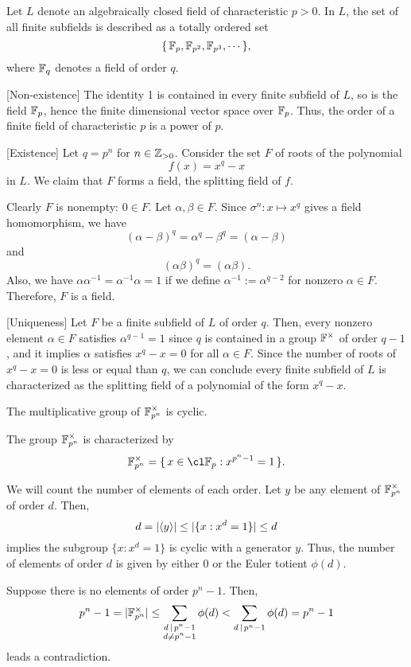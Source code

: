 \documentclass{../note}
\begin{document}
\begin{thm}
Let $L$ denote an algebraically closed field of characteristic $p>0$.
In $L$, the set of all finite subfields is described as a totally ordered set
\[\{\,\mathbb{F}_p,\mathbb{F}_{p^2},\mathbb{F}_{p^3},\cdots\,\},\]
where $\mathbb{F}_q$ denotes a field of order $q$.
\end{thm}
\begin{pf}
[Non-existence]
The identity 1 is contained in every finite subfield of $L$, so is the field $\mathbb{F}_p$, hence the finite dimensional vector space over $\mathbb{F}_p$.
Thus, the order of a finite field of characteristic $p$ is a power of $p$.

[Existence]
Let $q=p^n$ for $n\in\mathbb{Z}_{>0}$.
Consider the set $F$ of roots of the polynomial
\[f(x)=x^q-x\]
in $L$.
We claim that $F$ forms a field, the splitting field of $f$.

Clearly $F$ is nonempty: $0\in F$.
Let $\alpha,\beta\in F$.
Since $\sigma^n:x\mapsto x^q$ gives a field homomorphism, we have
\[(\alpha-\beta)^q=\alpha^q-\beta^q=(\alpha-\beta)\]
and
\[(\alpha\beta)^q=(\alpha\beta).\]
Also, we have $\alpha\alpha^{-1}=\alpha^{-1}\alpha=1$ if we define $\alpha^{-1}:=\alpha^{q-2}$ for nonzero $\alpha\in F$.
Therefore, $F$ is a field.

[Uniqueness]
Let $F$ be a finite subfield of $L$ of order $q$.
Then, every nonzero element $\alpha\in F$ satisfies $\alpha^{q-1}=1$ since $q$ is contained in a group $\mathbb{F}^\times$ of order $q-1$, and it implies $\alpha$ satisfies $x^q-x=0$ for all $\alpha\in F$.
Since the number of roots of $x^q-x=0$ is less or equal than $q$, we can conclude every finite subfield of $L$ is characterized as the splitting field of a polynomial of the form $x^q-x$.
\end{pf}

\begin{thm}
The multiplicative group of $\mathbb{F}_{p^n}^\times$ is cyclic.
\end{thm}
\begin{pf}
The group $\mathbb{F}_{p^n}^\times$ is characterized by
\[\F_{p^n}^\times=\{\,x\in\cl\F_p:x^{p^n-1}=1\,\}.\]

We will count the number of elements of each order.
Let $y$ be any element of $\mathbb{F}_{p^n}^\times$ of order $d$.
Then,
\[d=|\langle y\rangle|\le|\{x:x^d=1\}|\le d\]
implies the subgroup $\{x:x^d=1\}$ is cyclic with a generator $y$.
Thus, the number of elements of order $d$ is given by either 0 or the Euler totient $\phi(d)$.

Suppose there is no elements of order $p^n-1$.
Then,
\[p^n-1=|\mathbb{F}_{p^n}^\times|\le\sum_{\substack{d\,\mid\,p^n-1\\d\ne p^n-1}}\phi(d)<\sum_{d\,\mid\,p^n-1}\phi(d)=p^n-1\]
leads a contradiction.
\end{pf}
\end{document}
